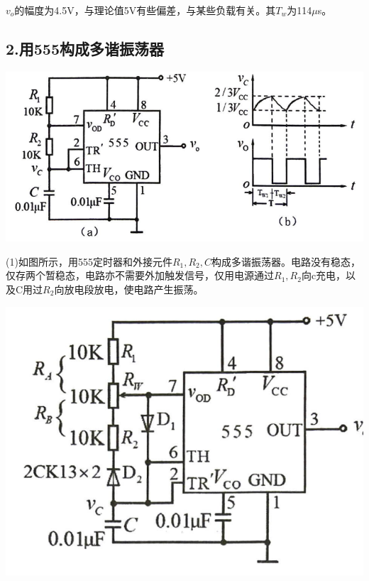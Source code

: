 \documentclass{ctexart}
\begin{document}
    $v_o$的幅度为4.5V，与理论值5V有些偏差，与某些负载有关。其$T_w$为114$\mu$s。

    \subsection*{2.用555构成多谐振荡器}
    \begin{minipage}[c]{\textwidth}
         \centering
         \includegraphics[width=\linewidth]{3.2.1.png}
    \end{minipage}

    (1)如图所示，用555定时器和外接元件$R_1,R_2,C$构成多谐振荡器。电路没有稳态，仅存两个暂稳态，电路亦不需要外加触发信号，仅用电源通过$R_1,R_2$向c充电，以及C用过$R_2$向放电段放电，使电路产生振荡。

    \begin{minipage}[c]{\textwidth}
            \centering
            \includegraphics[width=\linewidth]{3.2.2.png}
    \end{minipage}
\end{document}
